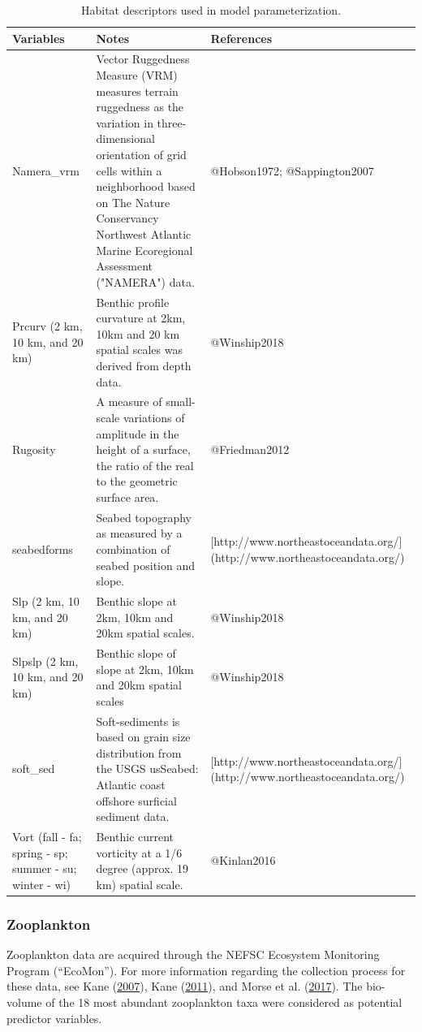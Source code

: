 \documentclass[
]{book}
\begin{document}
\begin{landscape}\begin{table}

\caption{\label{tab:habitatdesc}Habitat descriptors used in model parameterization.}
\centering
\fontsize{8}{10}\selectfont
\begin{tabular}[t]{lll}
\toprule
Variables & Notes & References\\
\midrule
Namera\_vrm & Vector Ruggedness Measure (VRM) measures terrain ruggedness as the variation in three-dimensional orientation of grid cells within a neighborhood based on The Nature Conservancy Northwest Atlantic Marine Ecoregional Assessment ("NAMERA") data. & @Hobson1972; @Sappington2007\\
Prcurv (2 km, 10 km, and 20 km) & Benthic profile curvature at 2km, 10km and 20 km spatial scales was derived from depth data. & @Winship2018\\
Rugosity & A measure of small-scale variations of amplitude in the height of a surface, the ratio of the real to the geometric surface area. & @Friedman2012\\
seabedforms & Seabed topography as measured by a combination of seabed position and slope. & [http://www.northeastoceandata.org/](http://www.northeastoceandata.org/)\\
Slp (2 km, 10 km, and 20 km) & Benthic slope at 2km, 10km and 20km spatial scales. & @Winship2018\\
\addlinespace
Slpslp (2 km, 10 km, and 20 km) & Benthic slope of slope at 2km, 10km and 20km spatial scales & @Winship2018\\
soft\_sed & Soft-sediments is based on grain size distribution from the USGS usSeabed: Atlantic coast offshore surficial sediment data. & [http://www.northeastoceandata.org/](http://www.northeastoceandata.org/)\\
Vort (fall - fa; spring - sp; summer - su; winter - wi) & Benthic current vorticity at a 1/6 degree (approx. 19 km) spatial scale. & @Kinlan2016\\
\bottomrule
\end{tabular}
\end{table}
\end{landscape}

\hypertarget{zooplankton}{%
\subsubsection{Zooplankton}\label{zooplankton}}

Zooplankton data are acquired through the NEFSC Ecosystem Monitoring Program (``EcoMon''). For more information regarding the collection process for these data, see Kane (\protect\hyperlink{ref-Kane2007}{2007}), Kane (\protect\hyperlink{ref-Kane2011}{2011}), and Morse et al. (\protect\hyperlink{ref-Morse2017}{2017}). The bio-volume of the 18 most abundant zooplankton taxa were considered as potential predictor variables.
\end{document}

